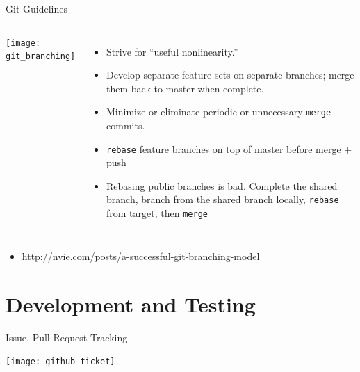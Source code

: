 \documentclass[mathserif]{beamer}
\begin{document}
\begin{frame}[fragile]{Git Guidelines}
  \begin{columns}
    \texttt{[image: git\_branching]}
    \begin{itemize}
    \item Strive for ``useful nonlinearity.''
    \item Develop separate feature sets on separate branches; merge them back to master when complete.
    \item Minimize or eliminate periodic or unnecessary \texttt{merge} commits.
    \item \texttt{rebase} feature branches on top of master before
        merge + push
    \item Rebasing public branches is bad\texttrademark.  Complete the
        shared branch, branch from the shared branch locally,
        \texttt{rebase} from target, then \texttt{merge}
    \end{itemize}
  \end{columns}
    \small
    \begin{itemize}
    \item \url{http://nvie.com/posts/a-successful-git-branching-model}
    \end{itemize}
\end{frame}


\section{Development and Testing}


\begin{frame}{Issue, Pull Request Tracking}
  \begin{center}
    \texttt{[image: github\_ticket]}
  \end{center}
\end{frame}
\end{document}
